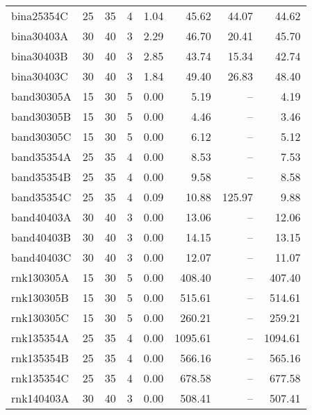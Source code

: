 \begin{scriptsize}
\begin{xtabular*}{\linewidth}{@{\extracolsep{\fill}}lrrrrrrr@{}}
bina25354C & \num{25} & \num{35} & \num{4} & \num{1.04} & \num{45.62} & \num{44.07} & \num{44.62} \\ 
bina30403A & \num{30} & \num{40} & \num{3} & \num{2.29} & \num{46.70} & \num{20.41} & \num{45.70} \\ 
bina30403B & \num{30} & \num{40} & \num{3} & \num{2.85} & \num{43.74} & \num{15.34} & \num{42.74} \\ 
bina30403C & \num{30} & \num{40} & \num{3} & \num{1.84} & \num{49.40} & \num{26.83} & \num{48.40} \\ 
band30305A & \num{15} & \num{30} & \num{5} & \num{0.00} & \num{5.19} & -- & \num{4.19} \\ 
band30305B & \num{15} & \num{30} & \num{5} & \num{0.00} & \num{4.46} & -- & \num{3.46} \\ 
band30305C & \num{15} & \num{30} & \num{5} & \num{0.00} & \num{6.12} & -- & \num{5.12} \\ 
band35354A & \num{25} & \num{35} & \num{4} & \num{0.00} & \num{8.53} & -- & \num{7.53} \\ 
band35354B & \num{25} & \num{35} & \num{4} & \num{0.00} & \num{9.58} & -- & \num{8.58} \\ 
band35354C & \num{25} & \num{35} & \num{4} & \num{0.09} & \num{10.88} & \num{125.97} & \num{9.88} \\ 
band40403A & \num{30} & \num{40} & \num{3} & \num{0.00} & \num{13.06} & -- & \num{12.06} \\ 
band40403B & \num{30} & \num{40} & \num{3} & \num{0.00} & \num{14.15} & -- & \num{13.15} \\ 
band40403C & \num{30} & \num{40} & \num{3} & \num{0.00} & \num{12.07} & -- & \num{11.07} \\ 
rnk130305A & \num{15} & \num{30} & \num{5} & \num{0.00} & \num{408.40} & -- & \num{407.40} \\ 
rnk130305B & \num{15} & \num{30} & \num{5} & \num{0.00} & \num{515.61} & -- & \num{514.61} \\ 
rnk130305C & \num{15} & \num{30} & \num{5} & \num{0.00} & \num{260.21} & -- & \num{259.21} \\ 
rnk135354A & \num{25} & \num{35} & \num{4} & \num{0.00} & \num{1095.61} & -- & \num{1094.61} \\ 
rnk135354B & \num{25} & \num{35} & \num{4} & \num{0.00} & \num{566.16} & -- & \num{565.16} \\ 
rnk135354C & \num{25} & \num{35} & \num{4} & \num{0.00} & \num{678.58} & -- & \num{677.58} \\ 
rnk140403A & \num{30} & \num{40} & \num{3} & \num{0.00} & \num{508.41} & -- & \num{507.41} \\ 

\end{xtabular*}
\end{scriptsize}
